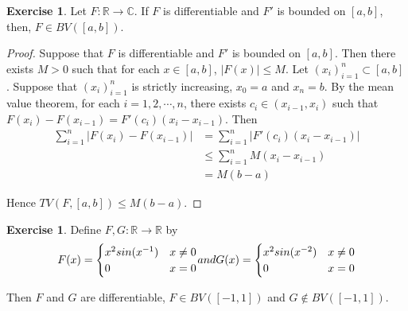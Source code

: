 \documentclass[12pt]{amsart}
\theoremstyle{definition}
\newtheorem{ex}[definition]{Exercise}
\newcommand{\C}{\mathbb{C}}
\newcommand{\R}{\mathbb{R}}
\begin{document}
	\begin{ex}
		Let $F:\R \rightarrow \C$. If $F$ is differentiable and $F'$ is bounded on $[a,b]$, then, $F \in BV([a,b])$. 
	\end{ex}
	
	\begin{proof}
		Suppose that $F$ is differentiable and $F'$ is bounded on $[a,b]$. Then there exists $M>0$ such that for each $x \in [a,b]$, $|F(x)| \leq M$. Let $(x_i)_{i=1}^n \subset [a,b]$. Suppose that $(x_i)_{i=1}^n$ is strictly increasing, $x_0=a$ and $x_n=b$. By the mean value theorem, for each $i =1,2, \cdots, n$, there exists $c_i\in (x_{i-1}, x_i)$ such that $F(x_i)-F(x_{i-1})=F'(c_i)(x_i-x_{i-1})$. Then 
		\begin{align*}
			\sum_{i=1}^n|F(x_i)-F(x_{i-1})|
			&= \sum_{i=1}^n|F'(c_i)(x_i-x_{i-1})|\\
			&\leq  \sum_{i=1}^nM(x_i-x_{i-1})\\
			&=M(b-a)
		\end{align*}
		
		Hence $TV(F, [a,b]) \leq M(b-a)$.
	\end{proof}
	
	\begin{ex}
		Define $F,G:\R \rightarrow \R$ by 
		\[ F(x) = \begin{cases}
			x^2sin(x^{-1}) & x \neq 0\\
			0 & x=0\\
		\end{cases}$$ and $$G(x)=
		\begin{cases}
			x^2sin(x^{-2}) & x \neq 0\\
			0 & x=0
		\end{cases}
		\]
		
		Then $F$ and $G$ are differentiable, $F \in BV([-1,1])$ and $G \not \in BV([-1,1])$.
	\end{ex}
	
\end{document}
